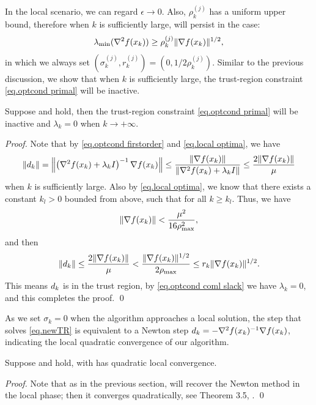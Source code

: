 In the local scenario, we can regard $\epsilon\to 0$. Also, $\rho_k^{(j)}$ has a uniform upper bound, therefore when $k$ is sufficiently large,  will persist in the case:
$$\lambda_{\min}(\nabla ^2 f(x_k))\geq \rho_k^{(j)}\|\nabla f(x_k)\|^{1/2},$$
in which we always set $ (\sigma_k^{(j)},r_k^{(j)}) = ( 0, 1/2\rho_k^{(j)})$. Similar to the previous discussion, we show that when $k$ is sufficiently large, the trust-region constraint \eqref{eq.optcond primal} will be inactive.
\begin{lemma}
    \label{lem.inactive tr}
    Suppose  and  hold, then the trust-region constraint \eqref{eq.optcond primal} will be inactive and $\lambda_k = 0$ when $k\to +\infty$.
\end{lemma}
\begin{proof}
    Note that by \eqref{eq.optcond firstorder} and \eqref{eq.local optima}, we have
    \begin{equation}
        \label{eq.local step norm}
        \|d_k\| =\left\|\left(\nabla ^2 f(x_k)+\lambda_k I\right )^{-1}\nabla f(x_k)\right\|\leq \frac{\|\nabla f(x_k)\|}{\|\nabla ^2 f(x_k)+\lambda_k I\|}\leq \frac{2\|\nabla f(x_k)\|}{\mu}
    \end{equation}
    when $k$ is sufficiently large.
    Also by \eqref{eq.local optima}, we know that there exists a constant $k_l > 0$ bounded from above, 
    such that for all $k\geq k_l$. Thus, we have
    $$\|\nabla f(x_k)\| <  \frac{\mu^2}{16\rho_{\max}^2},$$
    and then
    \begin{equation*}
        \| d_k\| \leq \frac{2\|\nabla f(x_k)\|}{\mu} < \frac{\|\nabla f(x_k)\|^{1/2}}{2\rho_{\max}}\leq r_k\|\nabla f(x_k)\|^{1/2}.
    \end{equation*}
    This means $d_k$ is in the trust region, by \eqref{eq.optcond coml slack} we have $\lambda_k = 0$, and this completes the proof.
\smartqed \qed \end{proof}
As we set $\sigma_k = 0$ when the algorithm approaches a local solution, the step that solves \eqref{eq.newTR} is equivalent to a Newton step $d_k = -\nabla ^2 f(x_k)^{-1}\nabla f(x_k)$, indicating the local quadratic convergence of our algorithm.
\begin{theorem}
    \label{thm.local}
    Suppose  and  hold,  with  has quadratic local convergence.
\end{theorem}
\begin{proof}
    Note that as in the previous section,  will recover the Newton method in the local phase; then it converges quadratically, see Theorem 3.5, \cite{nocedal1999numerical}.
\smartqed \qed \end{proof}






